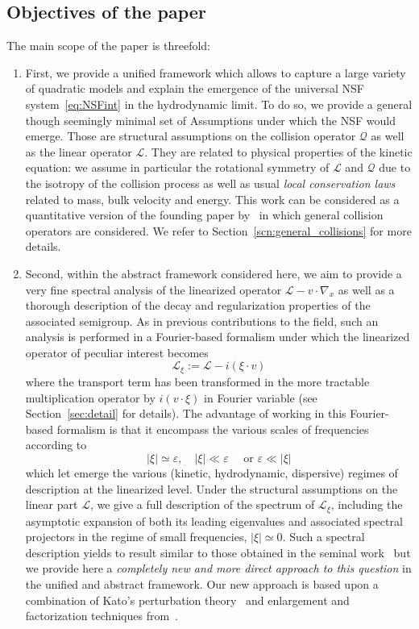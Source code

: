 \documentclass[10pt]{amsart}
\theoremstyle{definition}\newtheorem{defi}[theo]{Definition}\newtheorem{rema}[theo]{Remark}\newtheorem{exam}[theo]{Example}\newtheorem{exem}[theo]{Example}\newtheorem{nota}[theo]{Notation}
\newcommand{\LL}{\mathcal{L}}
\newcommand{\QQ}{\mathcal{Q}}
\newcommand*\eps{{\varepsilon}}
\newcommand*{\relabel}{\renewcommand{\labelenumi}{(\theenumi)}}
\newcommand*{\Romanebfnumi}{\renewcommand*{\theenumi}{\textbf{\Roman{enumi}}}\relabel}
\begin{document}
\subsection{Objectives of the paper}

The main scope of the paper is threefold:
\begin{enumerate}\Romanebfnumi
\item\label{I} First, we provide a unified framework which allows to capture a large variety of quadratic models and explain the emergence of the universal NSF system~\eqref{eq:NSFint} in the hydrodynamic limit. To do so, we provide a general though seemingly minimal set of Assumptions under which the NSF would emerge. Those are structural assumptions on the collision operator $\QQ$ as well as the linear operator $\LL$. They are related to physical properties of the kinetic equation: we assume in particular the rotational symmetry of $\LL$ and $\QQ$ due to the isotropy of the collision process as well as usual \emph{local conservation laws} related to mass, bulk velocity and energy. This work can be considered as a quantitative version of the founding paper by~\cite{BaGoLe1} in which general collision operators are considered. We refer to Section~\ref{scn:general_collisions} for more details.
\item\label{II} Second, within the abstract framework considered here, we aim to provide a very fine spectral analysis of the linearized operator $\LL-v\cdot \nabla_{x}$ as well as a thorough description of the decay {and regularization} properties of the associated semigroup. As in previous contributions to the field, such an analysis is performed in a Fourier-based formalism under which the linearized operator of peculiar interest becomes
\[
\LL_{\xi}:=\LL-i(\xi\cdot v)
\]
where the transport term has been transformed in the more tractable multiplication operator by $i(v\cdot \xi)$ in Fourier variable (see Section~\ref{sec:detail} for details). The advantage of working in this Fourier-based formalism is that it encompass the various scales of frequencies according to
\[
|\xi| \simeq \eps, \quad |\xi| \ll \eps \quad \text{ or } \eps \ll |\xi|
\]
which let emerge the various (kinetic, hydrodynamic, dispersive) regimes of description at the linearized level. Under the structural assumptions on the linear part $\LL$, we give a full description of the spectrum of $\LL_{\xi}$, including the asymptotic expansion of both its leading eigenvalues and associated spectral projectors in the regime of small frequencies, $|\xi| \simeq 0$. Such a spectral description yields to result similar to those obtained in the seminal work~\cite{EP1975} but we provide here a \emph{completely new and more direct approach to this question} in the unified and abstract framework. Our new approach is based upon a combination of Kato's perturbation theory~\cite{K1995} and enlargement and factorization techniques from~\cite{GMM2017}.



\end{enumerate}
\end{document}
